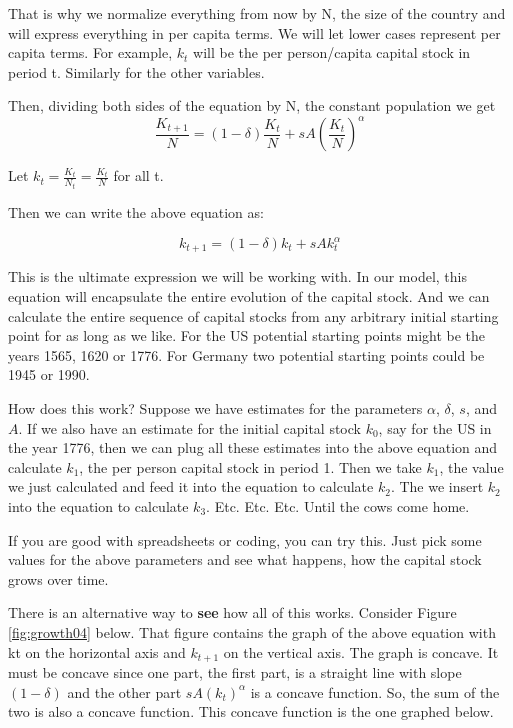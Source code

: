 \documentclass[
]{book}
\begin{document}
That is why we normalize everything from now by N, the size of the country and will express everything in per capita terms. We will let lower cases represent per capita terms. For example, \(k_t\) will be the per person/capita capital stock in period t. Similarly for the other variables.

Then, dividing both sides of the equation by N, the constant population we get
\[\frac{K_{t+1}}{N}=(1-\delta)\frac{K_t}{N}+sA(\frac{K_t}{N})^\alpha\]

Let \(k_t=\frac{K_t}{N_t} = \frac{K_t}{N}\) for all t.

Then we can write the above equation as:

\[k_{t+1}=(1-\delta) k_t+s A k_t^α\]

This is the ultimate expression we will be working with. In our model, this equation will encapsulate the entire evolution of the capital stock. And we can calculate the entire sequence of capital stocks from any arbitrary initial starting point for as long as we like. For the US potential starting points might be the years 1565, 1620 or 1776. For Germany two potential starting points could be 1945 or 1990.

How does this work? Suppose we have estimates for the parameters \(\alpha\), \(\delta\), \(s\), and \(A\). If we also have an estimate for the initial capital stock \(k_0\), say for the US in the year 1776, then we can plug all these estimates into the above equation and calculate \(k_1\), the per person capital stock in period 1. Then we take \(k_1\), the value we just calculated and feed it into the equation to calculate \(k_2\). The we insert \(k_2\) into the equation to calculate \(k_3\).
Etc.
Etc.
Etc.
Until the cows come home.

If you are good with spreadsheets or coding, you can try this. Just pick some values for the above parameters and see what happens, how the capital stock grows over time.

There is an alternative way to \textbf{see} how all of this works. Consider Figure \ref{fig:growth04} below. That figure contains the graph of the above equation with kt on the horizontal axis and \(k_{t+1}\) on the vertical axis.
The graph is concave. It must be concave since one part, the first part, is a straight line with slope \((1 - \delta)\) and the other part \(sA(k_t)^\alpha\) is a concave function. So, the sum of the two is also a concave function. This concave function is the one graphed below.
\end{document}
